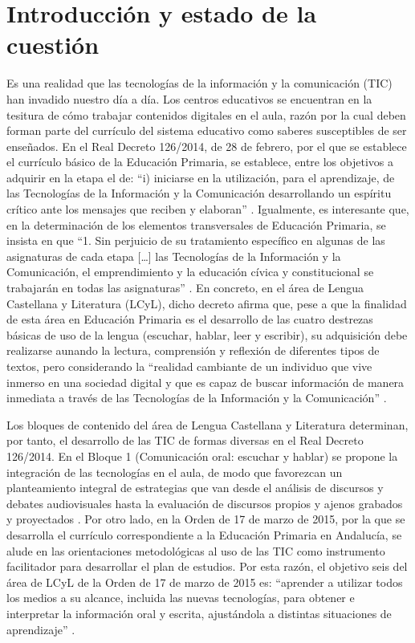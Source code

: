 \documentclass{textolivre}
\begin{document}
\section{Introducción y estado de la cuestión}\label{sec-intro}
Es una realidad que las tecnologías de la información y la comunicación (TIC) han invadido nuestro día a día. Los centros educativos se encuentran en la tesitura de cómo trabajar contenidos digitales en el aula, razón por la cual deben forman parte del currículo del sistema educativo como saberes susceptibles de ser enseñados. En el Real Decreto 126/2014, de 28 de febrero, por el que se establece el currículo básico de la Educación Primaria, se establece, entre los objetivos a adquirir en la etapa el de: “i) iniciarse en la utilización, para el aprendizaje, de las Tecnologías de la Información y la Comunicación desarrollando un espíritu crítico ante los mensajes que reciben y elaboran” \cite[p. 19354]{ministerio_de_educacion_y_ciencia_real_2014}. Igualmente, es interesante que, en la determinación de los elementos transversales de Educación Primaria, se insista en que “1. Sin perjuicio de su tratamiento específico en algunas de las asignaturas de cada etapa […] las Tecnologías de la Información y la Comunicación, el emprendimiento y la educación cívica y constitucional se trabajarán en todas las asignaturas” \cite[p. 19356]{ministerio_de_educacion_y_ciencia_real_2014}. En concreto, en el área de Lengua Castellana y Literatura (LCyL), dicho decreto afirma que, pese a que la finalidad de esta área en Educación Primaria es el desarrollo de las cuatro destrezas básicas de uso de la lengua (escuchar, hablar, leer y escribir), su adquisición debe realizarse aunando la lectura, comprensión y reflexión de diferentes tipos de textos, pero considerando la “realidad cambiante de un individuo que vive inmerso en una sociedad digital y que es capaz de buscar información de manera inmediata a través de las Tecnologías de la Información y la Comunicación” \cite[p. 19378]{ministerio_de_educacion_y_ciencia_real_2014}.

Los bloques de contenido del área de Lengua Castellana y Literatura determinan, por tanto, el desarrollo de las TIC de formas diversas en el Real Decreto 126/2014. En el Bloque 1 (Comunicación oral: escuchar y hablar) se propone la integración de las tecnologías en el aula, de modo que favorezcan un planteamiento integral de estrategias que van desde el análisis de discursos y debates audiovisuales hasta la evaluación de discursos propios y ajenos grabados y proyectados \cite[p. 19379]{ministerio_de_educacion_y_ciencia_real_2014}. Por otro lado, en la Orden de 17 de marzo de 2015, por la que se desarrolla el currículo correspondiente a la Educación Primaria en Andalucía, se alude en las orientaciones metodológicas al uso de las TIC como instrumento facilitador para desarrollar el plan de estudios. Por esta razón, el objetivo seis del área de LCyL de la Orden de 17 de marzo de 2015 es: “aprender a utilizar todos los medios a su alcance, incluida las nuevas tecnologías, para obtener e interpretar la información oral y escrita, ajustándola a distintas situaciones de aprendizaje” \cite[p. 157]{junta_de_andalucia_orden_2015}. 
\end{document}
